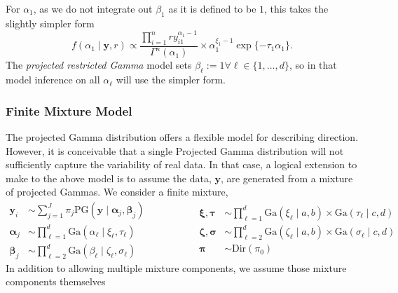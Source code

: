   For $\alpha_1$, as we do not integrate out $\beta_1$ as it is defined to be $1$, this takes the
  slightly simpler form
  \begin{equation}
    \label{eqn:alphafc1}
    f(\alpha_1 \mid \bm{ y}, r) \propto
      \frac{{\textstyle\prod}_{i = 1}^n ry_{i1}^{\alpha_1 - 1}}{\Gamma^n(\alpha_1)} \times
      \alpha_1^{\xi_1 - 1}\exp\{-\tau_1\alpha_1\}.
  \end{equation}
  The \emph{projected restricted Gamma} model sets $\beta_{\ell} := 1 \forall \ell \in \lbrace 1,\ldots,d\rbrace$,
  so in that model inference on all $\alpha_{\ell}$ will use the simpler form.

\subsubsection{Finite Mixture Model}
The projected Gamma distribution offers a flexible model for describing direction.  However, it is
  conceivable that a single Projected Gamma distribution will not sufficiently capture the
  variability of real data.  In that case, a logical extension to make to the above model is to
  assume the data, $\bm{ y}$, are generated from a mixture of projected Gammas.  We consider a finite
  mixture,
  \begin{equation}
    \label{eqn:fmixp}
    \begin{aligned}
      \bm{ y}_i &\sim \sum_{j = 1}^J\pi_j\text{PG}\left(\bm{ y}\mid \bm{ \alpha}_j, \bm{ \beta}_j\right)\\
      \bm{ \alpha}_j &\sim {\textstyle \prod}_{\ell = 1}^d \text{Ga}\left(\alpha_{\ell}\mid\xi_{\ell},\tau_{\ell}\right)\\
      \bm{ \beta}_j &\sim {\textstyle \prod}_{\ell = 2}^d \text{Ga}\left(\beta_{\ell}\mid\zeta_{\ell},\sigma_{\ell}\right)
    \end{aligned}
    \hspace{2cm}
    \begin{aligned}
      \bm{ \xi},\bm{\tau} &\sim {\textstyle \prod}_{\ell = 1}^d \text{Ga}(\xi_{\ell}\mid a,b) \times \text{Ga}(\tau_{\ell}\mid c,d)\\
      \bm{ \zeta},\bm{\sigma} &\sim {\textstyle\prod}_{\ell = 2}^d\text{Ga}(\zeta_{\ell} \mid a,b)\times \text{Ga}(\sigma_{\ell}\mid c,d)\\
      \bm{ \pi} &\sim \text{Dir}(\pi_0)
    \end{aligned}
  \end{equation}
  In addition to allowing multiple mixture components, we assume those mixture components themselves
